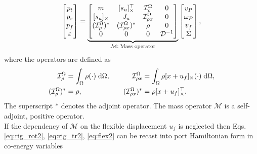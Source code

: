 \begin{equation}
\label{eq:mass_op}
\begin{bmatrix}
p_t \\ p_r \\ p_f \\ \varepsilon \\
\end{bmatrix} = 
\underbrace{\begin{bmatrix}
	m & \crmat{s_u}^\top & \mathcal{I}_\rho^{\Omega} & 0 \\
	\crmat{s_u} & J_u & \mathcal{I}_{\rho x}^{\Omega} & 0  \\
	(\mathcal{I}_\rho^{\Omega})^* & (\mathcal{I}_{\rho x}^{\Omega})^* & \rho & 0  \\
	0 & 0 & 0 & {\mathcal{D}}^{-1} \\
	\end{bmatrix}}_{\mathcal{M}: \; \text{Mass operator}}
\begin{bmatrix}
v_P \\ \omega_P  \\ v_f  \\ \Sigma \\
\end{bmatrix},
\end{equation}
where the operators are defined as
\begin{equation*}
\begin{aligned}
\mathcal{I}_\rho^\Omega &=\int_{\Omega} \rho (\cdot) \d{\Omega}, \\
(\mathcal{I}_\rho^{\Omega})^* &= \rho, \\
\end{aligned} \qquad
\begin{aligned} 
\mathcal{I}_{\rho x}^{\Omega} &= \int_\Omega \rho \crmat{x+u_f} (\cdot) \d{\Omega}, \\
(\mathcal{I}_{\rho x}^{\Omega})^* &= \rho \crmat{x+u_f}^\top. \\
\end{aligned}
\end{equation*}
The superscript $*$ denotes the adjoint operator. The mass operator $\mathcal{M}$ is a self-adjoint, positive operator. \\
If the dependency of $\mathcal{M}$ on the flexible displacement $u_f$ is neglected then Eqs. \eqref{eq:rig_rot2}, \eqref{eq:rig_tr2}, \eqref{eq:flex2} can be recast into port Hamiltonian form in co-energy variables
